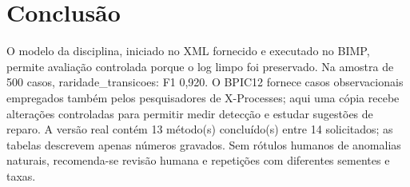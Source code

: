 \documentclass[conference]{IEEEtran}
\begin{document}
\clearpage
\section{Conclusão}
O modelo da disciplina, iniciado no XML fornecido e executado no BIMP, permite avaliação controlada porque o log limpo foi preservado. Na amostra de 500 casos, raridade\_transicoes: F1 0,920. O BPIC12 fornece casos observacionais empregados também pelos pesquisadores de X-Processes; aqui uma cópia recebe alterações controladas para permitir medir detecção e estudar sugestões de reparo. A versão real contém 13 método(s) concluído(s) entre 14 solicitados; as tabelas descrevem apenas números gravados. Sem rótulos humanos de anomalias naturais, recomenda-se revisão humana e repetições com diferentes sementes e taxas.



\end{document}
